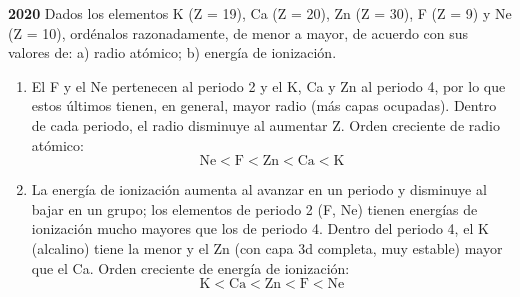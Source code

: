 \begin{exerciseEVAU}
    \textbf{2020} Dados los elementos K (Z = 19), Ca (Z = 20), Zn (Z = 30), F (Z = 9) y Ne (Z = 10), ordénalos razonadamente, de menor a mayor, de acuerdo con sus valores de: a) radio atómico; b) energía de ionización.

    \begin{solu}


        \begin{enumerate}[label=\letraminuscula]
            \item El F y el Ne pertenecen al periodo 2 y el K, Ca y Zn al periodo 4, por lo que estos últimos tienen, en general, mayor radio (más capas ocupadas). Dentro de cada periodo, el radio disminuye al aumentar Z. Orden creciente de radio atómico:
            \[
            \text{Ne} < \text{F} < \text{Zn} < \text{Ca} < \text{K}
            \]

            \item La energía de ionización aumenta al avanzar en un periodo y disminuye al bajar en un grupo; los elementos de periodo 2 (F, Ne) tienen energías de ionización mucho mayores que los de periodo 4. Dentro del periodo 4, el K (alcalino) tiene la menor y el Zn (con capa 3d completa, muy estable) mayor que el Ca. Orden creciente de energía de ionización:
            \[
            \text{K} < \text{Ca} < \text{Zn} < \text{F} < \text{Ne}
            \]
        \end{enumerate}
    \end{solu}
\end{exerciseEVAU}


